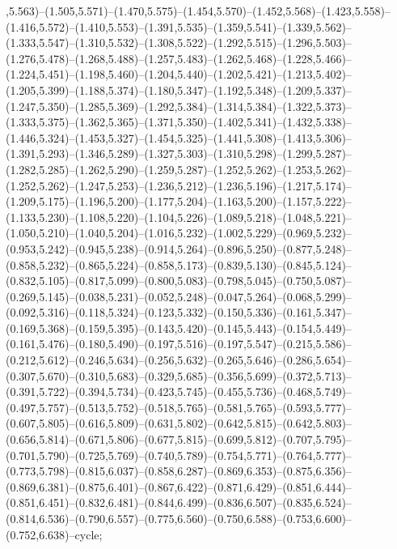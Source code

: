 ,5.563)--(1.505,5.571)--(1.470,5.575)--(1.454,5.570)--(1.452,5.568)--(1.423,5.558)--(1.416,5.572)--(1.410,5.553)--(1.391,5.535)--(1.359,5.541)--(1.339,5.562)--(1.333,5.547)--(1.310,5.532)--(1.308,5.522)--(1.292,5.515)--(1.296,5.503)--(1.276,5.478)--(1.268,5.488)--(1.257,5.483)--(1.262,5.468)--(1.228,5.466)--(1.224,5.451)--(1.198,5.460)--(1.204,5.440)--(1.202,5.421)--(1.213,5.402)--(1.205,5.399)--(1.188,5.374)--(1.180,5.347)--(1.192,5.348)--(1.209,5.337)--(1.247,5.350)--(1.285,5.369)--(1.292,5.384)--(1.314,5.384)--(1.322,5.373)--(1.333,5.375)--(1.362,5.365)--(1.371,5.350)--(1.402,5.341)--(1.432,5.338)--(1.446,5.324)--(1.453,5.327)--(1.454,5.325)--(1.441,5.308)--(1.413,5.306)--(1.391,5.293)--(1.346,5.289)--(1.327,5.303)--(1.310,5.298)--(1.299,5.287)--(1.282,5.285)--(1.262,5.290)--(1.259,5.287)--(1.252,5.262)--(1.253,5.262)--(1.252,5.262)--(1.247,5.253)--(1.236,5.212)--(1.236,5.196)--(1.217,5.174)--(1.209,5.175)--(1.196,5.200)--(1.177,5.204)--(1.163,5.200)--(1.157,5.222)--(1.133,5.230)--(1.108,5.220)--(1.104,5.226)--(1.089,5.218)--(1.048,5.221)--(1.050,5.210)--(1.040,5.204)--(1.016,5.232)--(1.002,5.229)--(0.969,5.232)--(0.953,5.242)--(0.945,5.238)--(0.914,5.264)--(0.896,5.250)--(0.877,5.248)--(0.858,5.232)--(0.865,5.224)--(0.858,5.173)--(0.839,5.130)--(0.845,5.124)--(0.832,5.105)--(0.817,5.099)--(0.800,5.083)--(0.798,5.045)--(0.750,5.087)--(0.269,5.145)--(0.038,5.231)--(0.052,5.248)--(0.047,5.264)--(0.068,5.299)--(0.092,5.316)--(0.118,5.324)--(0.123,5.332)--(0.150,5.336)--(0.161,5.347)--(0.169,5.368)--(0.159,5.395)--(0.143,5.420)--(0.145,5.443)--(0.154,5.449)--(0.161,5.476)--(0.180,5.490)--(0.197,5.516)--(0.197,5.547)--(0.215,5.586)--(0.212,5.612)--(0.246,5.634)--(0.256,5.632)--(0.265,5.646)--(0.286,5.654)--(0.307,5.670)--(0.310,5.683)--(0.329,5.685)--(0.356,5.699)--(0.372,5.713)--(0.391,5.722)--(0.394,5.734)--(0.423,5.745)--(0.455,5.736)--(0.468,5.749)--(0.497,5.757)--(0.513,5.752)--(0.518,5.765)--(0.581,5.765)--(0.593,5.777)--(0.607,5.805)--(0.616,5.809)--(0.631,5.802)--(0.642,5.815)--(0.642,5.803)--(0.656,5.814)--(0.671,5.806)--(0.677,5.815)--(0.699,5.812)--(0.707,5.795)--(0.701,5.790)--(0.725,5.769)--(0.740,5.789)--(0.754,5.771)--(0.764,5.777)--(0.773,5.798)--(0.815,6.037)--(0.858,6.287)--(0.869,6.353)--(0.875,6.356)--(0.869,6.381)--(0.875,6.401)--(0.867,6.422)--(0.871,6.429)--(0.851,6.444)--(0.851,6.451)--(0.832,6.481)--(0.844,6.499)--(0.836,6.507)--(0.835,6.524)--(0.814,6.536)--(0.790,6.557)--(0.775,6.560)--(0.750,6.588)--(0.753,6.600)--(0.752,6.638)--cycle;
